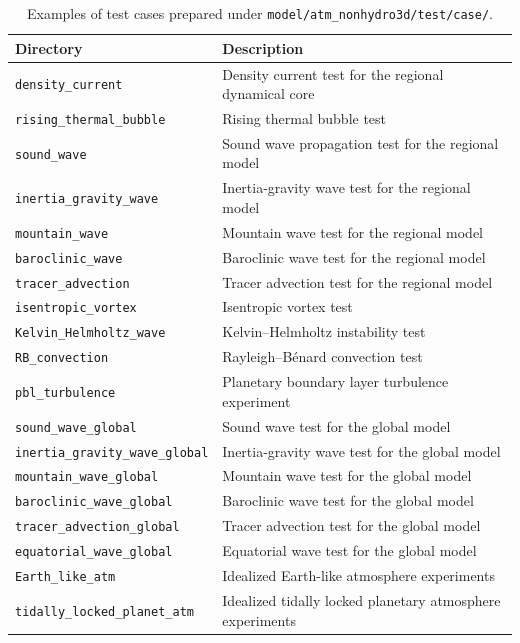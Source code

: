\begin{table}[t]
\caption{Examples of test cases prepared under \texttt{model/atm\_nonhydro3d/test/case/}.}
\label{tab:available_test_cases}
\begin{center}
\begin{tabularx}{150mm}{lX}
\hline
\rowcolor[gray]{0.9}
Directory & Description \\
\hline
\verb|density_current| & Density current test for the regional dynamical core \\
\verb|rising_thermal_bubble| & Rising thermal bubble test \\
\verb|sound_wave| & Sound wave propagation test for the regional model \\
\verb|inertia_gravity_wave| & Inertia-gravity wave test for the regional model \\
\verb|mountain_wave| & Mountain wave test for the regional model \\
\verb|baroclinic_wave| & Baroclinic wave test for the regional model \\
\verb|tracer_advection| & Tracer advection test for the regional model \\
\verb|isentropic_vortex| & Isentropic vortex test \\
\verb|Kelvin_Helmholtz_wave| & Kelvin--Helmholtz instability test \\
\verb|RB_convection| & Rayleigh--B\'enard convection test \\
\verb|pbl_turbulence| & Planetary boundary layer turbulence experiment \\
\verb|sound_wave_global| & Sound wave test for the global model \\
\verb|inertia_gravity_wave_global| & Inertia-gravity wave test for the global model \\
\verb|mountain_wave_global| & Mountain wave test for the global model \\
\verb|baroclinic_wave_global| & Baroclinic wave test for the global model \\
\verb|tracer_advection_global| & Tracer advection test for the global model \\
\verb|equatorial_wave_global| & Equatorial wave test for the global model \\
\verb|Earth_like_atm| & Idealized Earth-like atmosphere experiments \\
\verb|tidally_locked_planet_atm| & Idealized tidally locked planetary atmosphere experiments \\
\hline
\end{tabularx}
\end{center}
\end{table}

